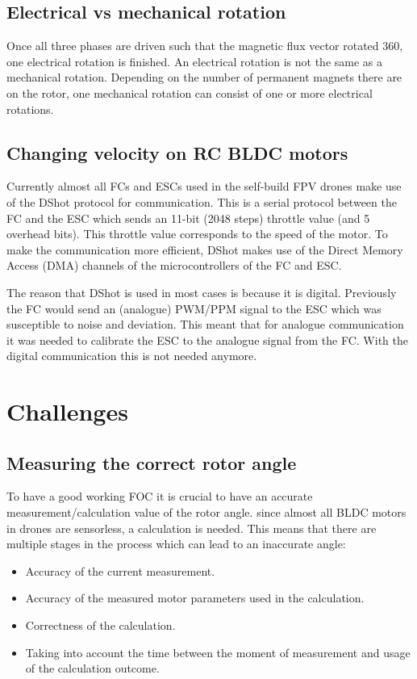 \documentclass[]{report}
\begin{document}
\section{Electrical vs mechanical rotation}

Once all three phases are driven such that the magnetic flux vector rotated 360\degree, one electrical rotation is finished. An electrical rotation is not the same as a mechanical rotation. Depending on the number of permanent magnets there are on the rotor, one mechanical rotation can consist of one or more electrical rotations.

\section{Changing velocity on RC BLDC motors} \label{section:ChangingVelocityOnRcBldcMotors}
Currently almost all FCs and ESCs used in the self-build FPV drones make use of the DShot protocol for communication. This is a serial protocol between the FC and the ESC which sends an 11-bit (2048 steps) throttle value \cite{DShot_Overview} (and 5 overhead bits). This throttle value corresponds to the speed of the motor. To make the communication more efficient, DShot makes use of the Direct Memory Access (DMA) channels of the microcontrollers of the FC and ESC.

The reason that DShot is used in most cases is because it is digital. Previously the FC would send an (analogue) PWM/PPM signal to the ESC which was susceptible to noise and deviation. This meant that for analogue communication it was needed to calibrate the ESC to the analogue signal from the FC. With the digital communication this is not needed anymore.

\chapter{Challenges} \label{chapter:Challenges}

\section{Measuring the correct rotor angle}
To have a good working FOC it is crucial to have an accurate measurement/calculation value of the rotor angle. since almost all BLDC motors in drones are sensorless, a calculation is needed. This means that there are multiple stages in the process which can lead to an inaccurate angle:
\begin{itemize}
	\item Accuracy of the current measurement.
	\item Accuracy of the measured motor parameters used in the calculation.
	\item Correctness of the calculation.
	\item Taking into account the time between the moment of measurement and usage of the calculation outcome.
\end{itemize}
\end{document}

